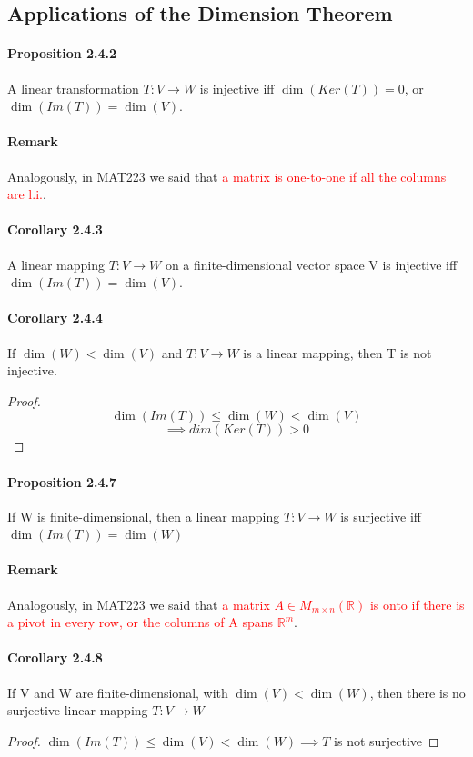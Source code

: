 \documentclass[11pt]{article}
\newcommand{\litran}[0]{$T: V \rightarrow W$ }
\newcommand{\real}[0]{\mathbb{R}}
\begin{document}
{\subsection{Applications of the Dimension Theorem}
\paragraph{Proposition 2.4.2} A linear transformation \litran is injective iff $\dim(Ker(T)) = 0$, or $\dim(Im(T)) = \dim(V)$.
\paragraph{Remark} Analogously, in MAT223 we said that \textcolor{red}{a matrix is one-to-one if all the columns are l.i.}.
\paragraph{Corollary 2.4.3} A linear mapping \litran on a finite-dimensional vector space V is injective iff $\dim(Im(T)) = \dim(V)$.
\paragraph{Corollary 2.4.4} If $\dim(W) < \dim(V)$ and \litran is a linear mapping, then T is not injective. \newline
\begin{proof}
	$$\dim(Im(T)) \leq \dim(W) < \dim(V)$$
	$$\implies dim(Ker(T)) > 0$$
\end{proof}
\paragraph{Proposition 2.4.7} If W is finite-dimensional, then a linear mapping \litran is surjective iff $\dim(Im(T)) = \dim(W)$
\paragraph{Remark} Analogously, in MAT223 we said that \textcolor{red}{a matrix $A \in M_{m\times n}(\real)$ is onto if there is a pivot in every row, or the columns of A spans $\real^m$}.
\paragraph{Corollary 2.4.8} If V and W are finite-dimensional, with $\dim(V) < \dim(W)$, then there is no surjective linear mapping \litran \newline
\begin{proof}
	$\dim(Im(T)) \leq \dim(V) < \dim(W) \implies T$ is not surjective
\end{proof}
}
\end{document}
